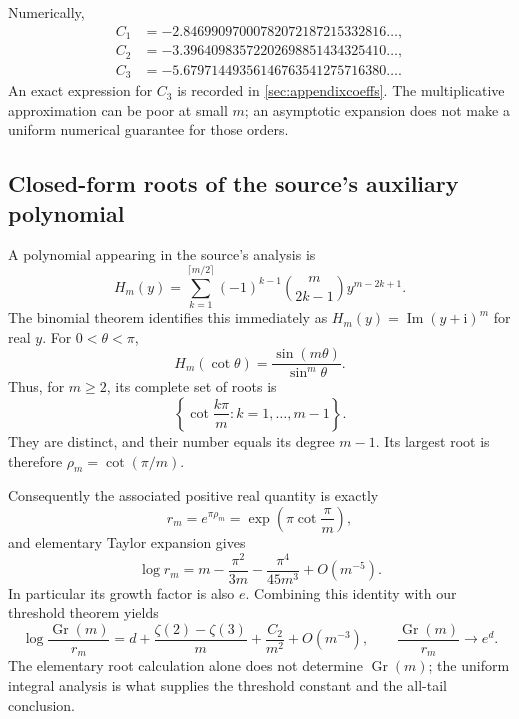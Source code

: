 \documentclass[11pt]{article}
\numberwithin{equation}{section}
\theoremstyle{definition}
\newcommand{\Gr}{\operatorname{Gr}}
\newcommand{\ii}{\mathrm i}
\begin{document}
Numerically,
\begin{align*}
 C_1&=-2.84699097000782072187215332816\ldots,\\
 C_2&=-3.39640983572202698851434325410\ldots,\\
 C_3&=-5.67971449356146763541275716380\ldots.
\end{align*}
An exact expression for $C_3$ is recorded in \cref{sec:appendixcoeffs}.
The multiplicative approximation can be poor at small $m$; an asymptotic
expansion does not make a uniform numerical guarantee for those orders.

\subsection{Closed-form roots of the source's auxiliary polynomial}
A polynomial appearing in the source's analysis \cite{XZ2026} is
\begin{equation}\label{eq:H}
 H_m(y)=\sum_{k=1}^{\lceil m/2\rceil}(-1)^{k-1}
                         \binom m{2k-1}y^{m-2k+1}.
\end{equation}
The binomial theorem identifies this immediately as
$H_m(y)=\operatorname{Im}(y+\ii)^m$ for real $y$.
For $0<\theta<\pi$,
\begin{equation}\label{eq:cot}
 H_m(\cot\theta)=\frac{\sin(m\theta)}{\sin^m\theta}.
\end{equation}
Thus, for $m\ge2$, its complete set of roots is
\begin{equation}\label{eq:Hroots}
 \left\{\cot\frac{k\pi}{m}:k=1,\ldots,m-1\right\}.
\end{equation}
They are distinct, and their number equals its degree $m-1$.
Its largest root is therefore $\rho_m=\cot(\pi/m)$.

Consequently the associated positive real quantity is exactly
\begin{equation}\label{eq:rm}
 r_m=e^{\pi\rho_m}=\exp\!\left(\pi\cot\frac\pi m\right),
\end{equation}
and elementary Taylor expansion gives
\begin{equation}\label{eq:rmasym}
 \log r_m=m-\frac{\pi^2}{3m}-\frac{\pi^4}{45m^3}+O(m^{-5}).
\end{equation}
In particular its growth factor is also $e$. Combining this identity
with our threshold theorem yields
\begin{equation}\label{eq:comparison}
 \log\frac{\Gr(m)}{r_m}
 =d+\frac{\zeta(2)-\zeta(3)}{m}
             +\frac{C_2}{m^2}+O(m^{-3}),
 \qquad \frac{\Gr(m)}{r_m}\longrightarrow e^d.
\end{equation}
The elementary root calculation alone does not determine $\Gr(m)$;
the uniform integral analysis is what supplies the threshold constant
and the all-tail conclusion.
\end{document}
